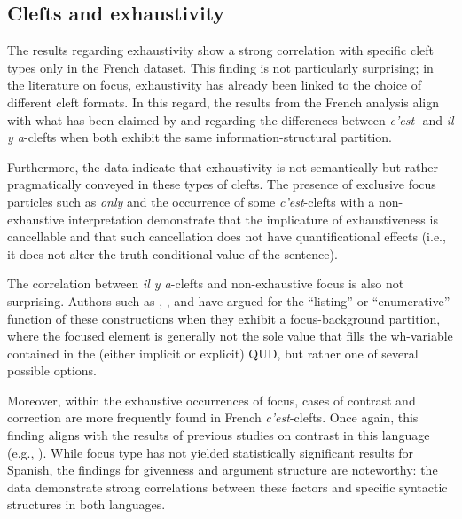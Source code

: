 \subsection{Clefts and exhaustivity} \label{sub:6.10.1}
The results regarding exhaustivity show a strong correlation with specific cleft types only in the French dataset. This finding is not particularly surprising; in the literature on focus, exhaustivity has already been linked to the choice of different cleft formats. In this regard, the results from the French analysis align with what has been claimed by \textcite{de2015status} and \textcite{karssenberg2017oiseaux} regarding the differences between \textit{c'est}- and \textit{il y a}-clefts when both exhibit the same information-structural partition.

Furthermore, the data indicate that exhaustivity is not semantically but rather pragmatically conveyed in these types of clefts. The presence of exclusive focus particles such as \textit{only} and the occurrence of some \textit{c'est}-clefts with a non-exhaustive interpretation demonstrate that the implicature of exhaustiveness is cancellable and that such cancellation does not have quantificational effects (i.e., it does not alter the truth-conditional value of the sentence).

The correlation between \textit{il y a}-clefts and non-exhaustive focus is also not surprising. Authors such as \textcite{de2015status}, \textcite{verwimp2017definite}, and \textcite{karssenberg2017oiseaux} have argued for the ``listing” or ``enumerative” function of these constructions when they exhibit a focus-background partition, where the focused element is generally not the sole value that fills the wh-variable contained in the (either implicit or explicit) QUD, but rather one of several possible options.

Moreover, within the exhaustive occurrences of focus, cases of contrast and correction are more frequently found in French \textit{c'est}-clefts. Once again, this finding aligns with the results of previous studies on contrast in this language (e.g., \cite{lambrecht1996information}).
While focus type has not yielded statistically significant results for Spanish, the findings for givenness and argument structure are noteworthy: the data demonstrate strong correlations between these factors and specific syntactic structures in both languages.

